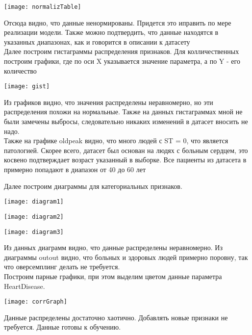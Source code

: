 \texttt{[image: normalizTable]} 

\pagebreak

Отсюда видно, что данные ненормированы. Придется это иправить по мере реализации
модели. Также можно подтвердить, что данные находятся в указанных диапазонах,
как и говорится в описании к датасету\\

Далее построим гистаграммы распределения признаков. Для колличественных построим графики, где по оси X указывается значение параметра, а по Y - его количество

\texttt{[image: gist]} 

Из графиков видно, что значения распределены неравномерно, но эти распределения
похожи на нормальные. Также на данных гистаграммах мной не были замечены выбросы, следовательно никаких изменений в датасет вносить не надо.\\

Также на графике oldpeak видно, что много людей с ST = 0, что является патологией. Скорее
всего, датасет был основан на людях с больным сердцем, это косвено подтверждает возраст указанный в выборке. Все пациенты из датасета в примерно попадают в диапазон от 40 до 60 лет\\

\pagebreak

Далее построим диаграммы для категориальных признаков.

\texttt{[image: diagram1]} 

\texttt{[image: diagram2]} 

\texttt{[image: diagram3]} 

Из данных диаграмм видно, что данные распределены неравномерно. Из диаграммы outout видно, что больных и здоровых людей примерно поровну, так что оверсемплинг делать не требуется.\\

Построим парные графики, при этом выделим цветом данные параметра HeartDisease.


\texttt{[image: corrGraph]} 

Данные распределены достаточно хаотично. Добавлять новые признаки не требуется. Данные готовы
к обучению.


\pagebreak
